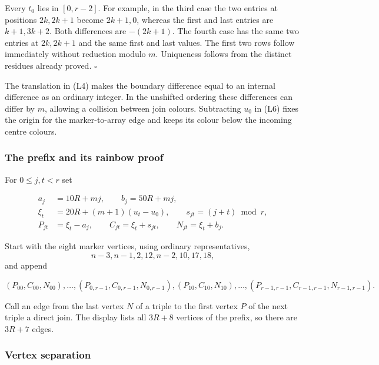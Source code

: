 \documentclass[11pt,a4paper]{article}
\begin{document}
Every \(t_0\) lies in \([0,r-2]\). For example, in the third case the two entries at positions \(2k,2k+1\) become \(2k+1,0\), whereas the first and last entries are \(k+1,3k+2\). Both differences are \(-(2k+1)\). The fourth case has the same two entries at \(2k,2k+1\) and the same first and last values. The first two rows follow immediately without reduction modulo \(m\). Uniqueness follows from the distinct residues already proved. \(\square\)

The translation in (L4) makes the boundary difference equal to an internal difference as an ordinary integer. In the unshifted ordering these differences can differ by \(m\), allowing a collision between join colours. Subtracting \(u_0\) in (L6) fixes the origin for the marker-to-array edge and keeps its colour below the incoming centre colours.

\hypertarget{the-prefix-and-its-rainbow-proof}{%
\subsubsection{The prefix and its rainbow proof}\label{the-prefix-and-its-rainbow-proof}}

For \(0\leq j,t<r\) set

\begin{equation}
\begin{split}
a_j&=10R+mj,\qquad b_j=50R+mj,\\
\xi_t&=20R+(m+1)(u_t-u_0),\qquad s_{jt}=(j+t)\bmod r,\\
P_{jt}&=\xi_t-a_j,\qquad C_{jt}=\xi_t+s_{jt},\qquad
N_{jt}=\xi_t+b_j.
\end{split}
\tag{L6}\label{eq:L6}
\end{equation}

Start with the eight marker vertices, using ordinary representatives, \[
n-3,n-1,2,12,n-2,10,17,18,
\] and append

\begin{equation}
(P_{00},C_{00},N_{00}),\ldots,
(P_{0,r-1},C_{0,r-1},N_{0,r-1}),
(P_{10},C_{10},N_{10}),\ldots,
(P_{r-1,r-1},C_{r-1,r-1},N_{r-1,r-1}).
\tag{L7}\label{eq:L7}
\end{equation}

Call an edge from the last vertex \(N\) of a triple to the first vertex \(P\) of the next triple a direct join. The display lists all \(3R+8\) vertices of the prefix, so there are \(3R+7\) edges.

\hypertarget{vertex-separation}{%
\subsubsection{Vertex separation}\label{vertex-separation}}
\end{document}
